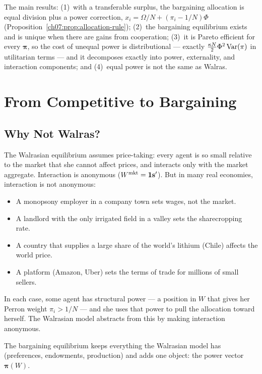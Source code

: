 \documentclass[../structural_economics_book.tex]{subfiles}
\begin{document}
The main results: (1)~with a transferable surplus, the bargaining allocation is equal division plus a power correction, $x_i = \Omega/N + (\pi_i - 1/N)\Phi$ (Proposition~\ref{ch07:prop:allocation-rule}); (2)~the bargaining equilibrium exists and is unique when there are gains from cooperation; (3)~it is Pareto efficient for every $\boldsymbol{\pi}$, so the cost of unequal power is distributional --- exactly $\frac{\kappa N}{2}\Phi^2\operatorname{Var}(\pi)$ in utilitarian terms --- and it decomposes exactly into power, externality, and interaction components; and (4)~equal power is not the same as Walras.


\section{From Competitive to Bargaining}
\label{ch07:sec:from_to}

\subsection{Why Not Walras?}

The Walrasian equilibrium assumes price-taking: every agent is so small relative to the market that she cannot affect prices, and interacts only with the market aggregate. Interaction is anonymous ($W^{\text{mkt}} = \mathbf{1}\mathbf{s}'$). But in many real economies, interaction is not anonymous:

\begin{itemize}
\item A monopsony employer in a company town sets wages, not the market.
\item A landlord with the only irrigated field in a valley sets the sharecropping rate.
\item A country that supplies a large share of the world's lithium (Chile) affects the world price.
\item A platform (Amazon, Uber) sets the terms of trade for millions of small sellers.
\end{itemize}

In each case, some agent has structural power --- a position in $W$ that gives her Perron weight $\pi_i > 1/N$ --- and she uses that power to pull the allocation toward herself. The Walrasian model abstracts from this by making interaction anonymous.

The bargaining equilibrium keeps everything the Walrasian model has (preferences, endowments, production) and adds one object: the power vector $\boldsymbol{\pi}(W)$.
\end{document}

